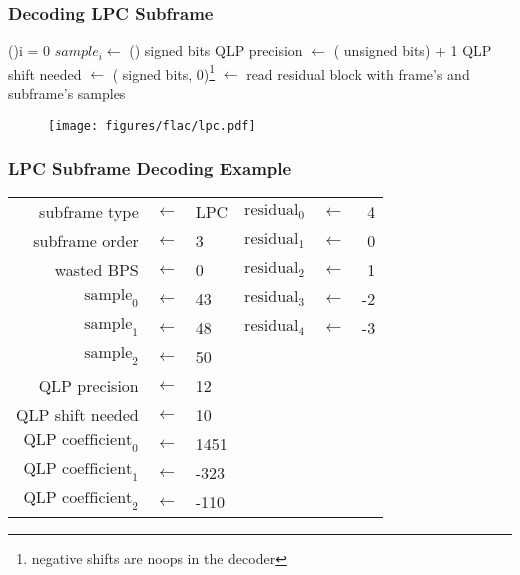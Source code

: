 \clearpage

\subsubsection{Decoding LPC Subframe}
\For(){i = 0 \emph{\KwTo}\ORDER}{
  $sample_i \leftarrow $ \READ (\BPS) signed bits\;
}
QLP precision $\leftarrow$ ( unsigned bits) + 1\;
QLP shift needed $\leftarrow$ \MAX( signed bits, 0)\footnote{negative shifts are noops in the decoder}\;
\RESIDUALS $\leftarrow$ read residual block with frame's \BLOCKSIZE and subframe's \ORDER\;
\Return samples\;
\EALGORITHM
\begin{figure}[h]
\texttt{[image: figures/flac/lpc.pdf]}
\end{figure}

\subsubsection{LPC Subframe Decoding Example}

\begin{tabular}{rcl|rcr}
subframe type & $\leftarrow$ & LPC &
$\text{residual}_0$ & $\leftarrow$ & 4 \\
subframe order & $\leftarrow$ & 3 &
$\text{residual}_1$ & $\leftarrow$ & 0 \\
wasted BPS & $\leftarrow$ & 0 &
$\text{residual}_2$ & $\leftarrow$ & 1 \\
$\text{sample}_0$ & $\leftarrow$ & 43 &
$\text{residual}_3$ & $\leftarrow$ & -2 \\
$\text{sample}_1$ & $\leftarrow$ & 48 &
$\text{residual}_4$ & $\leftarrow$ & -3 \\
$\text{sample}_2$ & $\leftarrow$ & 50 & & & \\
QLP precision & $\leftarrow$ & 12 & & & \\
QLP shift needed & $\leftarrow$ & 10 & & & \\
$\text{QLP coefficient}_0$ & $\leftarrow$ & 1451 & & & \\
$\text{QLP coefficient}_1$ & $\leftarrow$ & -323 & & & \\
$\text{QLP coefficient}_2$ & $\leftarrow$ & -110 & & & \\
\end{tabular}

